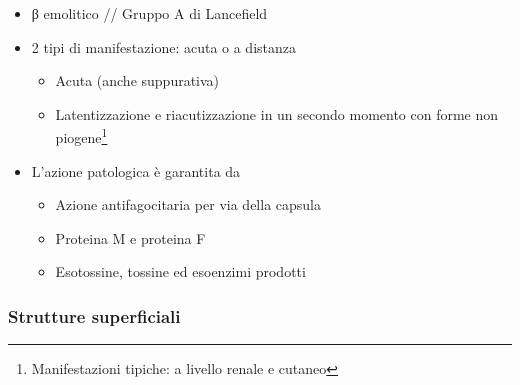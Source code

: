 \documentclass[italian,]{article}
\providecommand{\tightlist}{%
  \setlength{\itemsep}{0pt}\setlength{\parskip}{0pt}}
\begin{document}
\begin{itemize}
\tightlist
\item
  β emolitico // Gruppo A di Lancefield
\item
  2 tipi di manifestazione: acuta o a distanza

  \begin{itemize}
  \tightlist
  \item
    Acuta (anche suppurativa)
  \item
    Latentizzazione e riacutizzazione in un secondo momento con forme
    non piogene\footnote{Manifestazioni tipiche: a livello renale e
      cutaneo}
  \end{itemize}
\item
  L'azione patologica è garantita da

  \begin{itemize}
  \tightlist
  \item
    Azione antifagocitaria per via della capsula
  \item
    Proteina M e proteina F
  \item
    Esotossine, tossine ed esoenzimi prodotti
  \end{itemize}
\end{itemize}

\hypertarget{strutture-superficiali}{%
\subsubsection{Strutture superficiali}\label{strutture-superficiali}}
\end{document}

